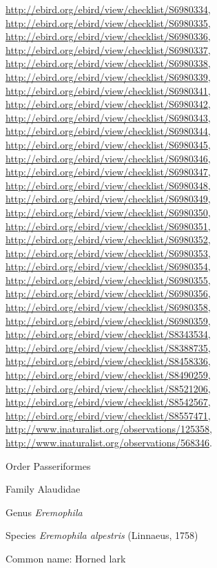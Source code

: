 \documentclass[9pt, article]{memoir}
\begin{document}
\begin{multicols}{2}
\url{http://ebird.org/ebird/view/checklist/S6980334}, 
\url{http://ebird.org/ebird/view/checklist/S6980335}, 
\url{http://ebird.org/ebird/view/checklist/S6980336}, 
\url{http://ebird.org/ebird/view/checklist/S6980337}, 
\url{http://ebird.org/ebird/view/checklist/S6980338}, 
\url{http://ebird.org/ebird/view/checklist/S6980339}, 
\url{http://ebird.org/ebird/view/checklist/S6980341}, 
\url{http://ebird.org/ebird/view/checklist/S6980342}, 
\url{http://ebird.org/ebird/view/checklist/S6980343}, 
\url{http://ebird.org/ebird/view/checklist/S6980344}, 
\url{http://ebird.org/ebird/view/checklist/S6980345}, 
\url{http://ebird.org/ebird/view/checklist/S6980346}, 
\url{http://ebird.org/ebird/view/checklist/S6980347}, 
\url{http://ebird.org/ebird/view/checklist/S6980348}, 
\url{http://ebird.org/ebird/view/checklist/S6980349}, 
\url{http://ebird.org/ebird/view/checklist/S6980350}, 
\url{http://ebird.org/ebird/view/checklist/S6980351}, 
\url{http://ebird.org/ebird/view/checklist/S6980352}, 
\url{http://ebird.org/ebird/view/checklist/S6980353}, 
\url{http://ebird.org/ebird/view/checklist/S6980354}, 
\url{http://ebird.org/ebird/view/checklist/S6980355}, 
\url{http://ebird.org/ebird/view/checklist/S6980356}, 
\url{http://ebird.org/ebird/view/checklist/S6980358}, 
\url{http://ebird.org/ebird/view/checklist/S6980359}, 
\url{http://ebird.org/ebird/view/checklist/S8343534}, 
\url{http://ebird.org/ebird/view/checklist/S8388735}, 
\url{http://ebird.org/ebird/view/checklist/S8458336}, 
\url{http://ebird.org/ebird/view/checklist/S8490259}, 
\url{http://ebird.org/ebird/view/checklist/S8521206}, 
\url{http://ebird.org/ebird/view/checklist/S8542567}, 
\url{http://ebird.org/ebird/view/checklist/S8557471}, 
\url{http://www.inaturalist.org/observations/125358}, 
\url{http://www.inaturalist.org/observations/568346}.

\vspace{6pt}\noindent\hspace{18pt}Order Passeriformes


\vspace{6pt}\noindent\hspace{24pt}Family Alaudidae


\vspace{6pt}\noindent\hspace{30pt}Genus \textit{Eremophila}


\vspace{6pt}\noindent\hspace{36pt}Species \textit{Eremophila alpestris} (Linnaeus, 1758)


Common name: Horned lark


\end{multicols}
\end{document}
